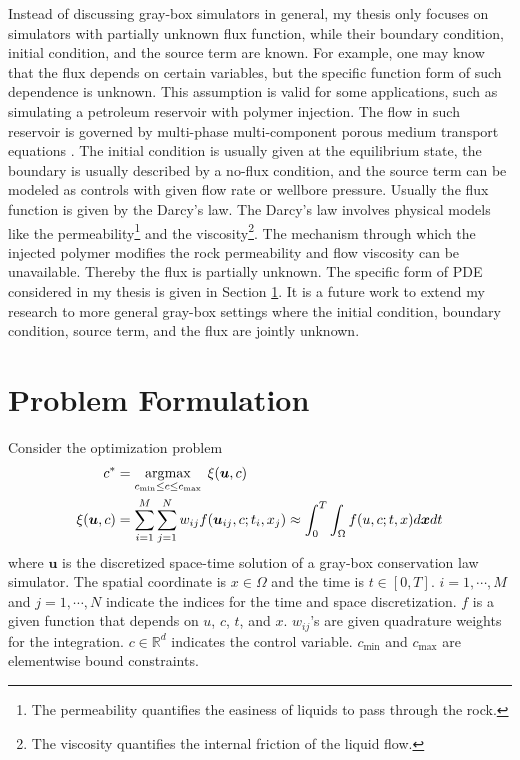 Instead of discussing gray-box simulators in general, my thesis only focuses on
simulators with partially unknown flux function, while their boundary condition,
initial condition, and the source term are known. For example, one may know that
the flux depends on certain variables, but the specific function form of such dependence is unknown.
This assumption is valid for some applications,
such as simulating a petroleum reservoir with polymer injection.
The flow in such reservoir is governed by multi-phase multi-component porous medium transport 
equations \cite{reservoir sim book}. The initial condition is usually given at the equilibrium state, the boundary
is usually described by a no-flux condition, and the source term can be modeled as controls
with given flow rate or wellbore pressure.
Usually the flux function is given by the Darcy's law.
The Darcy's law involves physical models like the permeability\footnote{The permeability quantifies the
easiness of liquids to pass through the rock.} and the viscosity\footnote{The viscosity quantifies the
internal friction of the liquid flow.}.
The mechanism through which the injected polymer modifies the rock permeability and flow viscosity can be unavailable. Thereby the flux is partially unknown.
The specific form of PDE considered in my thesis is given in Section \ref{sec: formulation}.
It is a future work to extend my research to more general gray-box settings where
the initial condition, boundary condition, source term, and the flux are jointly unknown.\\

\section{Problem Formulation}
\label{sec: formulation}
Consider the optimization problem
\begin{equation}\begin{split}
    c^* &= \argmax_{c_{\min}\le  c \le c_{\max}}\; \xi(\boldsymbol{u},c) \\
    \xi(\boldsymbol{u},c) &= \sum_{i=1}^M \sum_{j=1}^N w_{ij} f(\boldsymbol{u}_{ij},c; t_i,x_j)
    \approx \int_0^T \int_\Omega f(u,c; t,x)d\boldsymbol{x} d t%
    \label{eqn: objective prototype}
\end{split}\end{equation}
where $\boldsymbol{u}$ is the discretized space-time solution of a gray-box conservation law
simulator. The spatial coordinate is $x \in \Omega$ and the time is $t\in[0,T]$.
$i=1,\cdots, M$ and $j=1,\cdots, N$ indicate the indices for the time and space discretization.
$f$ is a given function that depends on $u$, $c$, $t$, and $x$.
$w_{ij}$'s are given quadrature weights for the integration.
$c\in\mathbb{R}^d$ indicates the control variable. 
$c_{\min}$ and $c_{\max}$ are elementwise bound constraints.\\

